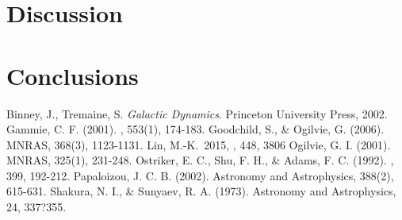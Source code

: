 \documentclass[apj]{emulateapj}
\begin{document}
\section{Discussion}




\section{Conclusions}

\begin{thebibliography}{}
 Binney, J., Tremaine, S. \emph{Galactic Dynamics}. Princeton University Press, 2002.
 Gammie, C. F. (2001). \apj, 553(1), 174-183. 
 Goodchild, S., \& Ogilvie, G. (2006). MNRAS, 368(3), 1123-1131. 
 Lin, M.-K.\ 2015, \mnras, 448, 3806  Ogilvie, G. I. (2001). MNRAS, 325(1), 231-248. 
 Ostriker, E. C., Shu, F. H., \& Adams, F. C. (1992). \apj, 399, 192-212. 
 Papaloizou, J. C. B. (2002). Astronomy and Astrophysics, 388(2), 615-631. 
 Shakura, N. I., \& Sunyaev, R. A. (1973). Astronomy and Astrophysics, 24, 337?355.
\end{thebibliography}
\end{document}
